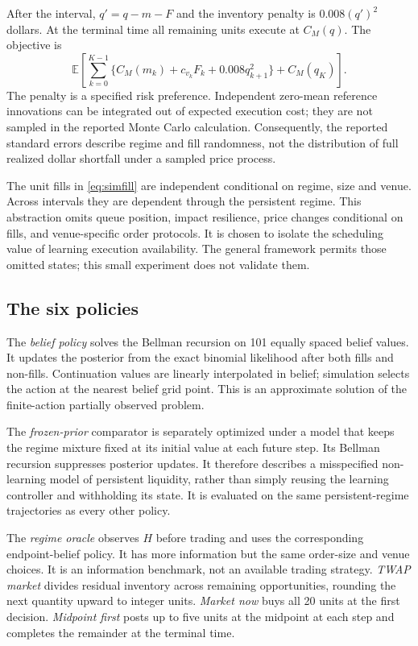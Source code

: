 \documentclass[11pt]{article}
\numberwithin{equation}{section}
\theoremstyle{definition}
\theoremstyle{remark}
\newcommand{\E}{\mathbb{E}}
\theoremstyle{definition}
\begin{document}
After the interval, $q'=q-m-F$ and the inventory penalty is
$0.008(q')^2$ dollars. At the terminal time all remaining units execute at
$C_M(q)$. The objective is
\begin{equation}\label{eq:simobjective}
 \E\left[\sum_{k=0}^{K-1}
   \{C_M(m_k)+c_{v_k}F_k+0.008q_{k+1}^2\}+C_M(q_K)\right].
\end{equation}
The penalty is a specified risk preference. Independent zero-mean reference
innovations can be integrated out of expected execution cost; they are not
sampled in the reported Monte Carlo calculation. Consequently, the reported
standard errors describe regime and fill randomness, not the distribution
of full realized dollar shortfall under a sampled price process.

The unit fills in \eqref{eq:simfill} are independent conditional on regime,
size and venue. Across intervals they are dependent through the persistent
regime. This abstraction omits queue position, impact resilience, price changes
conditional on fills, and venue-specific order protocols. It is chosen to
isolate the scheduling value of learning execution availability. The general
framework permits those omitted states; this small experiment does not validate
them.

\subsection{The six policies}

The \emph{belief policy} solves the Bellman recursion on 101 equally spaced
belief values. It updates the posterior from the exact binomial likelihood
after both fills and non-fills. Continuation values are linearly interpolated
in belief; simulation selects the action at the nearest belief grid point.
This is an approximate solution of the finite-action partially observed problem.

The \emph{frozen-prior} comparator is separately optimized under a model that
keeps the regime mixture fixed at its initial value at each future step. Its
Bellman recursion suppresses posterior updates. It therefore describes a
misspecified non-learning model of persistent liquidity, rather than simply
reusing the learning controller and withholding its state. It is evaluated
on the same persistent-regime trajectories as every other policy.

The \emph{regime oracle} observes $H$ before trading and uses the corresponding
endpoint-belief policy. It has more information but the same order-size and
venue choices. It is an information benchmark, not an available trading strategy.
\emph{TWAP market} divides residual inventory across remaining opportunities,
rounding the next quantity upward to integer units. \emph{Market now} buys all
20 units at the first decision. \emph{Midpoint first} posts up to five units
at the midpoint at each step and completes the remainder at the terminal time.
\end{document}
